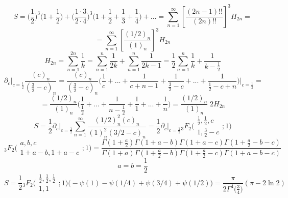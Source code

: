 


	$$S = \Big(\frac{1}{2}\Big)^3 \Big( 1+ \frac{1}{2} \Big)+\Big(\frac{1\cdot 3}{2 \cdot 4}\Big)^3 \Big( 1+ \frac{1}{2}+\frac{1}{3}+\frac{1}{4} \Big)+ ... =\sum_{n= 1}^{\infty} \left[ \frac{(2n-1)!!}{(2n)!!} \right]^3 H_{2n}=$$
	$$=\sum_{n= 1}^{\infty} \left[ \frac{(1/2)_n}{(1)_n} \right]^3 H_{2n}$$
	$$H_{2n} = \sum_{n= 1}^{2n} \frac{1}{k} = \sum_{n= 1}^{n} \frac{1}{2k}+\sum_{n= 1}^{n} \frac{1}{2k-1} = \frac{1}{2} \sum_{n= 1}^{n} \frac{1}{k}+\frac{1}{k-\frac{1}{2}}$$
	$$\partial_c \Big|_{c = \frac{1}{2}} \frac{(c)_n}{(\frac{3}{2} - c)_n} =  \frac{(c)_n}{(\frac{3}{2} - c)_n} \Big(\frac{1}{c}+...+ \frac{1}{c+n-1}+\frac{1}{\frac{3}{2}-c}+...+\frac{1}{\frac{1}{2}-c+n}\Big) \Big|_{c = \frac{1}{2}} =$$
	$$=\frac{(1/2)_n}{(1)_n} \Big(\frac{1}{\frac{1}{2}}+...+ \frac{1}{n-\frac{1}{2}}+\frac{1}{1}+...+\frac{1}{n}\Big) = \frac{(1/2)_n}{(1)_n} \;  2 H_{2n}$$
	$$S = \frac{1}{2}  \partial_c \Big|_{c = \frac{1}{2}} \sum_{n= 1}^{\infty} \frac{(1/2)_n^2 (c)_n}{(1)_n^2 (3/2-c)_n} =   \frac{1}{2}  \partial_c \Big|_{c = \frac{1}{2}} {}_3F_2 \Big(\begin{array}{c}
		\frac{1}{2}, \frac{1}{2}, c  \\ 1, \frac{3}{2}-c
	\end{array}; 1\Big) $$
	$${}_3F_2 \Big(\begin{array}{c}
		a, b, c  \\ 1+a-b, 1+a-c
	\end{array}; 1\Big) = \frac{\Gamma(1+\frac{a}{2}) \Gamma(1+a-b) \Gamma(1+a-c) \Gamma(1+\frac{a}{2}-b-c)}{\Gamma(1+a) \Gamma(1+\frac{a}{2}-b) \Gamma(1+\frac{a}{2}-c) \Gamma(1+a-b-c)}$$
	$$a = b = \frac{1}{2}$$
	$$S =\frac{1}{2} {}_3F_2 \Big(\begin{array}{c}
		\frac{1}{2}, \frac{1}{2}, \frac{1}{2}  \\ 1, 1
	\end{array}; 1\Big) \Big( -\psi(1)-\psi(1/4)+\psi(3/4)+\psi(1/2)\Big) =  \frac{\pi}{2\Gamma^4\Big(\frac{3}{4}\Big)} (\pi - 2 \ln2) $$
	
	
	
